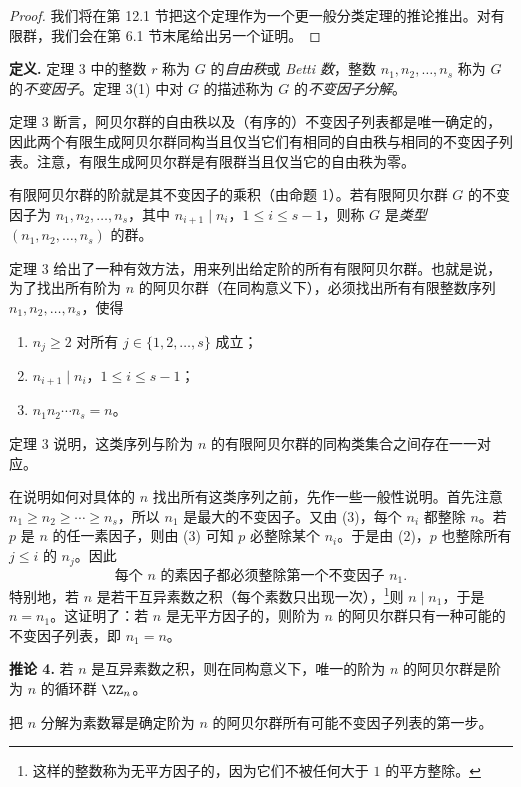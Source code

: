 \begin{proof}
我们将在第 12.1 节把这个定理作为一个更一般分类定理的推论推出。对有限群，我们会在第 6.1 节末尾给出另一个证明。
\end{proof}

\noindent\textbf{定义.} 定理 3 中的整数 $r$ 称为 $G$ 的\emph{自由秩}或 \emph{Betti 数}，整数 $n_1,n_2,\ldots,n_s$ 称为 $G$ 的\emph{不变因子}。定理 3(1) 中对 $G$ 的描述称为 $G$ 的\emph{不变因子分解}。

定理 3 断言，阿贝尔群的自由秩以及（有序的）不变因子列表都是唯一确定的，因此两个有限生成阿贝尔群同构当且仅当它们有相同的自由秩与相同的不变因子列表。注意，有限生成阿贝尔群是有限群当且仅当它的自由秩为零。

有限阿贝尔群的阶就是其不变因子的乘积（由命题 1）。若有限阿贝尔群 $G$ 的不变因子为 $n_1,n_2,
\ldots,n_s$，其中 $n_{i+1}\mid n_i$，$1\leq i\leq s-1$，则称 $G$ 是\emph{类型} $(n_1,n_2,
\ldots,n_s)$ 的群。

定理 3 给出了一种有效方法，用来列出给定阶的所有有限阿贝尔群。也就是说，为了找出所有阶为 $n$ 的阿贝尔群（在同构意义下），必须找出所有有限整数序列 $n_1,n_2,
\ldots,n_s$，使得
\begin{enumerate}[label=(\arabic*)]
  \item $n_j\geq 2$ 对所有 $j\in\{1,2,
\ldots,s\}$ 成立；
  \item $n_{i+1}\mid n_i$，$1\leq i\leq s-1$；
  \item $n_1n_2\cdots n_s=n$。
\end{enumerate}
定理 3 说明，这类序列与阶为 $n$ 的有限阿贝尔群的同构类集合之间存在一一对应。

在说明如何对具体的 $n$ 找出所有这类序列之前，先作一些一般性说明。首先注意 $n_1\geq n_2\geq\cdots\geq n_s$，所以 $n_1$ 是最大的不变因子。又由 (3)，每个 $n_i$ 都整除 $n$。若 $p$ 是 $n$ 的任一素因子，则由 (3) 可知 $p$ 必整除某个 $n_i$。于是由 (2)，$p$ 也整除所有 $j\leq i$ 的 $n_j$。因此
\[
  \text{每个 }n\text{ 的素因子都必须整除第一个不变因子 }n_1.
\]
特别地，若 $n$ 是若干互异素数之积（每个素数只出现一次），\footnote{这样的整数称为无平方因子的，因为它们不被任何大于 $1$ 的平方整除。}则 $n\mid n_1$，于是 $n=n_1$。这证明了：若 $n$ 是无平方因子的，则阶为 $n$ 的阿贝尔群只有一种可能的不变因子列表，即 $n_1=n$。

\medskip
\noindent\textbf{推论 4.} 若 $n$ 是互异素数之积，则在同构意义下，唯一的阶为 $n$ 的阿贝尔群是阶为 $n$ 的循环群 $\ZZ_n$。

把 $n$ 分解为素数幂是确定阶为 $n$ 的阿贝尔群所有可能不变因子列表的第一步。

